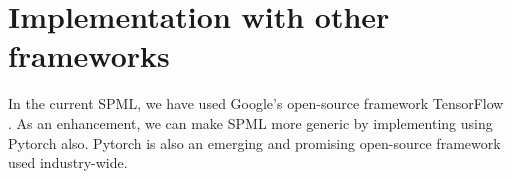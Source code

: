 \section{Implementation with other frameworks}
In the current SPML, we have used Google's open-source framework TensorFlow \cite{24}. As an enhancement, we can make SPML more generic by implementing using Pytorch \cite{75} also. Pytorch is also an emerging and promising open-source framework used industry-wide.

